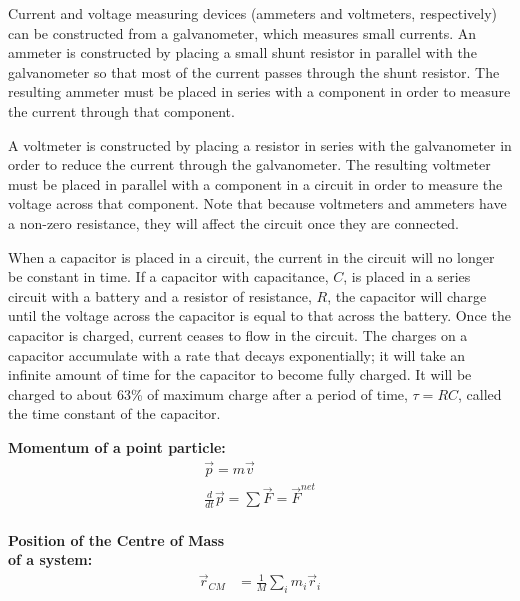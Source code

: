 \begin{chapterSummary}
Current and voltage measuring devices (ammeters and voltmeters, respectively) can be constructed from a galvanometer, which measures small currents. An ammeter is constructed by placing a small shunt resistor in parallel with the galvanometer so that most of the current passes through the shunt resistor. The resulting ammeter must be placed in series with a component in order to measure the current through that component.

A voltmeter is constructed by placing a resistor in series with the galvanometer in order to reduce the current through the galvanometer. The resulting voltmeter must be placed in parallel with a component in a circuit in order to measure the voltage across that component. Note that because voltmeters and ammeters have a non-zero resistance, they will affect the circuit once they are connected.

When a capacitor is placed in a circuit, the current in the circuit will no longer be constant in time. If a capacitor with capacitance, $C$, is placed in a series circuit with a battery and a resistor of resistance, $R$, the capacitor will charge until the voltage across the capacitor is equal to that across the battery. Once the capacitor is charged, current ceases to flow in the circuit. The charges on a capacitor accumulate with a rate that decays exponentially; it will take an infinite amount of time for the capacitor to become fully charged. It will be charged to about 63\% of maximum charge after a period of time, $\tau=RC$, called the time constant of the capacitor.

\end{chapterSummary}

\newpage
\begin{importantEquations}
\medskip
\begin{multicols}{2}
\textbf{Momentum of a point particle:}
\begin{align*}
\vec p = m\vec v \\
\frac{d}{dt}\vec p = \sum \vec F = \vec F^{net}
\end{align*}
\columnbreak
\\
\textbf{Position of the Centre of Mass \\ of a system:}
\begin{align*}
\vec r_{CM} &=\frac{1}{M}\sum_i m_i\vec r_i 
\end{align*}
\medskip
\end{multicols}
\end{importantEquations}

